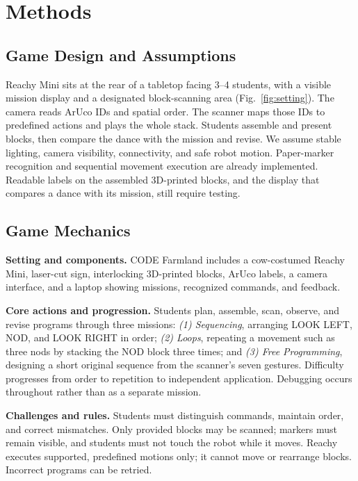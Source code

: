 \documentclass[conference,12pt,letterpaper]{IEEEtran}
\begin{document}
\section{Methods}

\subsection{Game Design and Assumptions}

Reachy Mini sits at the rear of a tabletop facing 3--4 students, with a visible mission display and a designated block-scanning area (Fig.~\ref{fig:setting}). The camera reads ArUco IDs and spatial order. The scanner maps those IDs to predefined actions and plays the whole stack. Students assemble and present blocks, then compare the dance with the mission and revise. We assume stable lighting, camera visibility, connectivity, and safe robot motion. Paper-marker recognition and sequential movement execution are already implemented. Readable labels on the assembled 3D-printed blocks, and the display that compares a dance with its mission, still require testing.

\subsection{Game Mechanics}

\textbf{Setting and components.} CODE Farmland includes a cow-costumed Reachy Mini, laser-cut sign, interlocking 3D-printed blocks, ArUco labels, a camera interface, and a laptop showing missions, recognized commands, and feedback.

\textbf{Core actions and progression.} Students plan, assemble, scan, observe, and revise programs through three missions: \emph{(1) Sequencing}, arranging LOOK LEFT, NOD, and LOOK RIGHT in order; \emph{(2) Loops}, repeating a movement such as three nods by stacking the NOD block three times; and \emph{(3) Free Programming}, designing a short original sequence from the scanner's seven gestures. Difficulty progresses from order to repetition to independent application. Debugging occurs throughout rather than as a separate mission.

\textbf{Challenges and rules.} Students must distinguish commands, maintain order, and correct mismatches. Only provided blocks may be scanned; markers must remain visible, and students must not touch the robot while it moves. Reachy executes supported, predefined motions only; it cannot move or rearrange blocks. Incorrect programs can be retried.
\end{document}
